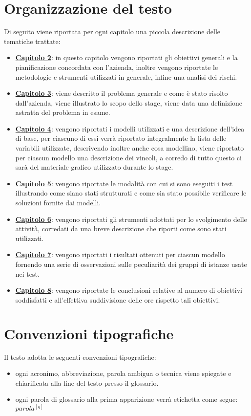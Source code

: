\section{Organizzazione del testo}
Di seguito viene riportata per ogni capitolo una piccola descrizione delle tematiche trattate:
\begin{itemize}
	\item \hyperlink{(chap:capitolo2)}{\textbf{Capitolo 2}}: in questo capitolo vengono riportati gli obiettivi generali e la pianificazione concordata con l'azienda, inoltre vengono riportate le metodologie e strumenti utilizzati in generale, infine una analisi dei rischi.
	\item \hyperlink{(chap:capitolo3)}{\textbf{Capitolo 3}}: viene descritto il problema generale e come è stato risolto dall'azienda, viene illustrato lo scopo dello stage, viene data una definizione astratta del problema in esame.
	\item \hyperlink{(chap:capitolo4)}{\textbf{Capitolo 4}}: vengono riportati i modelli utilizzati e una descrizione dell'idea di base, per ciascuno di essi verrà riportato integralmente la lista delle variabili utilizzate, descrivendo inoltre anche cosa modellino, viene riportato per ciascun modello una descrizione dei vincoli, a corredo di tutto questo ci sarà del materiale grafico utilizzato durante lo stage.
	\item \hyperlink{(chap:capitolo5)}{\textbf{Capitolo 5}}: vengono riportate le modalità con cui si sono eseguiti i test illustrando come siano stati strutturati e come sia stato possibile verificare le soluzioni fornite dai modelli.
	\item \hyperlink{(chap:capitolo6)}{\textbf{Capitolo 6}}: vengono riportati gli strumenti adottati per lo svolgimento delle attività, corredati da una breve descrizione che riporti come sono stati utilizzati.
	\item \hyperlink{(chap:capitolo7)}{\textbf{Capitolo 7}}: vengono riportati i risultati ottenuti per ciascun modello fornendo una serie di osservazioni sulle peculiarità dei gruppi di istanze usate nei test.
	\item \hyperlink{(chap:capitolo8)}{\textbf{Capitolo 8}}: vengono riportate le conclusioni relative al numero di obiettivi soddisfatti e all'effettiva suddivisione delle ore rispetto tali obiettivi.

\end{itemize}
\section{Convenzioni tipografiche}
Il testo adotta le seguenti convenzioni tipografiche:
\begin{itemize}
	\item ogni acronimo, abbreviazione, parola ambigua o tecnica viene spiegate e chiarificata alla fine del testo presso il glossario.
	\item ogni parola di glossario alla prima apparizione verrà etichetta come segue: $parola^{[g]}$
\end{itemize}
